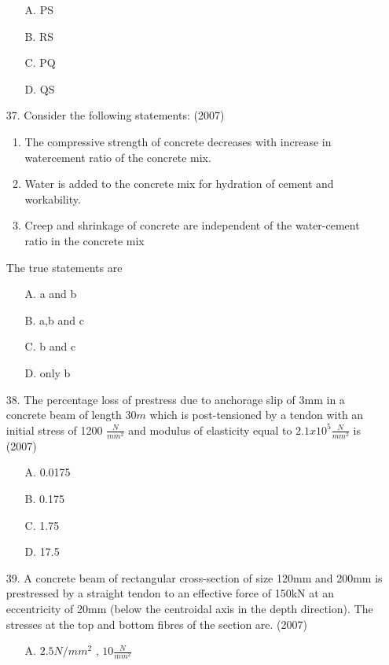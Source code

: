 \documentclass[journal]{IEEEtran}
\begin{document}
\begin{enumerate}
    \begin{enumerate}
        \item [A.] PS
        \item [B.] RS
        \item [C.] PQ
        \item [D.] QS
    \end{enumerate}
  \item[37.]  Consider the following statements: \hfill (2007)
  \begin{enumerate}
    \item The compressive strength of concrete decreases with increase in watercement ratio of the concrete mix.
    \item Water is added to the concrete mix for hydration of cement and
    workability. 
    \item Creep and shrinkage of concrete are independent of the water-cement ratio
    in the concrete mix
  \end{enumerate}
  The true statements are 
  \begin{enumerate}
    \item [A.] a and b
    \item [B.] a,b and c
    \item [C.] b and c
    \item [D.] only b
  \end{enumerate}
  \item [38.] The percentage loss of prestress due to anchorage slip of 3mm in a concrete beam
  of length $30m$ which is post-tensioned by a tendon with an initial stress of 1200 $\frac{N}{mm^2}$
  and modulus of elasticity equal to $2.1 x 10^5\frac{N}{mm^2}$ is \hfill (2007)
  \begin{enumerate}
    \item [A.] 0.0175 
    \item [B.] 0.175 
    \item [C.] 1.75 
    \item [D.] 17.5 
  \end{enumerate}
  \item [39.] A concrete beam of rectangular cross-section of size 120mm  and 200mm
   is prestressed by a straight tendon to an effective force of 150kN at an
  eccentricity of 20mm (below the centroidal axis in the depth direction). The
  stresses at the top and bottom fibres of the section are. \hfill (2007)
  \begin{enumerate}
    \item [A.] $2.5N/mm^2$ , $10\frac{N}{mm^2}$ 

\end{enumerate}
\end{enumerate}
\end{document}
